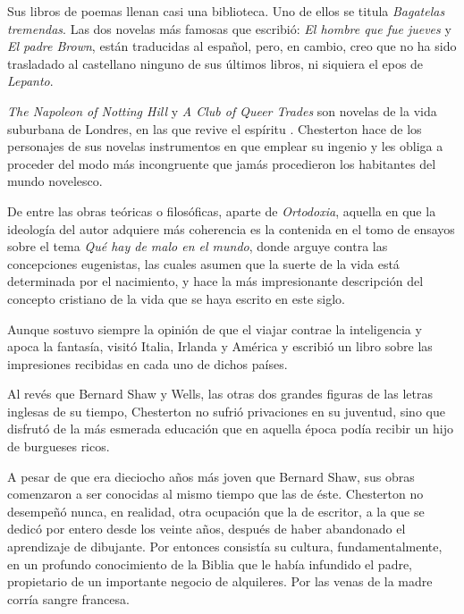 Sus libros de poemas llenan casi una biblioteca. Uno de ellos se titula \emph{Bagatelas tremendas}. Las
dos novelas más famosas que escribió: \emph{El hombre que fue jueves} y \emph{El padre Brown}, están traducidas
al español, pero, en cambio, creo que no ha sido trasladado al castellano ninguno de sus últimos libros, ni
siquiera el epos de \emph{Lepanto}.

\emph{The Napoleon of Notting Hill} y \emph{A Club of Queer Trades} son novelas de la vida suburbana de
Londres, en las que revive el espíritu . Chesterton hace de los personajes de sus novelas
instrumentos en que emplear su ingenio y les obliga a proceder del modo más incongruente que jamás
procedieron los habitantes del mundo novelesco.

De entre las obras teóricas o filosóficas, aparte de \emph{Ortodoxia}, aquella en que la ideología del autor
adquiere más coherencia es la contenida en el tomo de ensayos sobre el tema \emph{Qué hay de malo en el
mundo}, donde arguye contra las concepciones eugenistas, las cuales asumen que la suerte de la vida está
determinada por el nacimiento, y hace la más impresionante descripción del concepto cristiano de la vida
que se haya escrito en este siglo.

Aunque sostuvo siempre la opinión de que el viajar contrae la inteligencia y apoca la fantasía, visitó
Italia, Irlanda y América y escribió un libro sobre las impresiones recibidas en cada uno de dichos países.

Al revés que Bernard Shaw y Wells, las otras dos grandes figuras de las letras inglesas de su
tiempo, Chesterton no sufrió privaciones en su juventud, sino que disfrutó de la más esmerada educación
que en aquella época podía recibir un hijo de burgueses ricos.

A pesar de que era dieciocho años más joven que Bernard Shaw, sus obras comenzaron a ser
conocidas al mismo tiempo que las de éste. Chesterton no desempeñó nunca, en realidad, otra ocupación
que la de escritor, a la que se dedicó por entero desde los veinte años, después de haber abandonado el
aprendizaje de dibujante. Por entonces consistía su cultura, fundamentalmente, en un profundo
conocimiento de la Biblia que le había infundido el padre, propietario de un importante negocio de
alquileres. Por las venas de la madre corría sangre francesa.

